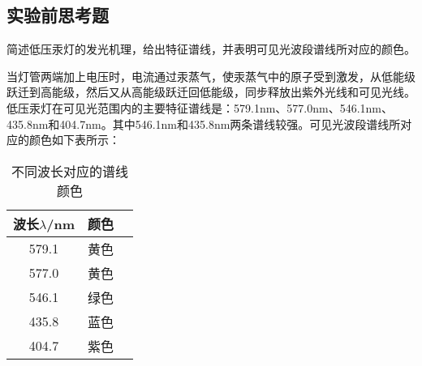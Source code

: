 \documentclass[dvipsnames, svgnames,a4paper,11pt]{article}
\begin{document}

\subsection{实验前思考题}
\begin{question}
	简述低压汞灯的发光机理，给出特征谱线，并表明可见光波段谱线所对应的颜色。%
\end{question}
当灯管两端加上电压时，电流通过汞蒸气，使汞蒸气中的原子受到激发，从低能级跃迁到高能级，然后又从高能级跃迁回低能级，同步释放出紫外光线和可见光线。低压汞灯在可见光范围内的主要特征谱线是：579.1nm、577.0nm、546.1nm、435.8nm和404.7nm。其中546.1nm和435.8nm两条谱线较强。可见光波段谱线所对应的颜色如下表所示：

\begin{table}[htbp]
	\centering
	\begin{tabular}{|c|c|c|}
		\hline
		波长$\lambda$/nm & 颜色 \\
		\hline
		579.1 & 黄色 \\
		\hline
		577.0 & 黄色 \\
		\hline
		546.1 & 绿色 \\
		\hline
		435.8 & 蓝色 \\
		\hline
		404.7 & 紫色 \\
		\hline
		
		
	\end{tabular}
	\caption{不同波长对应的谱线颜色}
	\label{tab:mytable}
\end{table}
\end{document}
